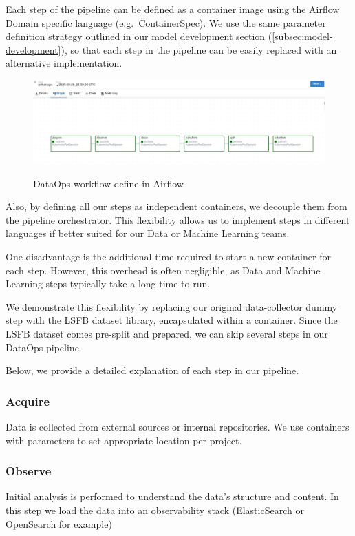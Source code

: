 Each step of the pipeline can be defined as a container image using the Airflow Domain specific language (e.g.\ ContainerSpec).
We use the same parameter definition strategy outlined in our model development section (\ref{subsec:model-development}),
so that each step in the pipeline can be easily replaced with an alternative implementation.

\begin{figure}[!htbp]
    \centering
    \caption{DataOps workflow define in Airflow}
    \includegraphics[scale=0.3]{images/project/dataops-workflow-airflow}
    \label{fig:dataops-workflow-airflow}
\end{figure}

Also, by defining all our steps as independent containers, we decouple them from the pipeline orchestrator.
This flexibility allows us to implement steps in different languages if better suited for our Data or Machine Learning teams.

One disadvantage is the additional time required to start a new container for each step.
However, this overhead is often negligible, as Data and Machine Learning steps typically take a long time to run.

We demonstrate this flexibility by replacing our original data-collector dummy step with the LSFB dataset library\cite{9534336}, encapsulated within a container.
Since the LSFB dataset comes pre-split and prepared, we can skip several steps in our DataOps pipeline.

Below, we provide a detailed explanation of each step in our pipeline.

\subsubsection{Acquire}
Data is collected from external sources or internal repositories.
We use containers with parameters to set appropriate location per project.

\subsubsection{Observe}
Initial analysis is performed to understand the data's structure and content.
In this step we load the data into an observability stack (ElasticSearch or OpenSearch for example)

